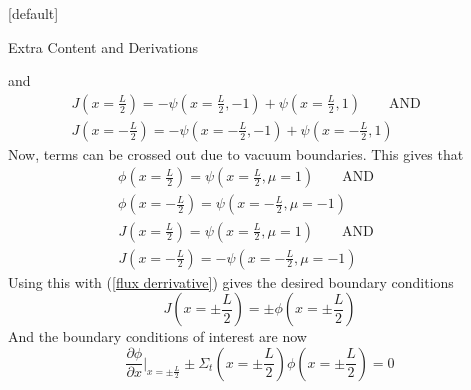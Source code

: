 \documentclass[9pt,t]{beamer}
\makeatletter
\newcommand{\QAND}{\qquad \text{AND} \qquad}
\newenvironment{withoutheadline}{
       \setbeamertemplate{headline}[default]
       \def\beamer@entrycode{\vspace*{-\headheight}}
    }{}
\makeatother
\begin{document}
\begin{withoutheadline}
\begin{frame}[allowframebreaks]{Extra Content and Derivations}
\begin{itemize}
        and
        \begin{multline}
            J(x=\frac{L}{2}) = - \psi(x=\frac{L}{2},-1)  + \psi(x=\frac{L}{2},1) \QAND \\ J(x=-\frac{L}{2}) = - \psi(x=-\frac{L}{2},-1)  + \psi(x=-\frac{L}{2},1)
        \end{multline}
        Now, terms can be crossed out due to vacuum boundaries. This gives that
        \begin{multline}
            \phi(x=\frac{L}{2}) =  \psi(x=\frac{L}{2},\mu =1) \QAND \\ \phi(x=-\frac{L}{2}) =  \psi(x=-\frac{L}{2},\mu =-1)
        \end{multline}
        \begin{multline}
            J(x=\frac{L}{2}) = \psi(x=\frac{L}{2},\mu =1) \QAND \\ J(x=-\frac{L}{2}) = - \psi(x=-\frac{L}{2},\mu =-1)
        \end{multline}
        Using this with (\ref{flux derrivative}) gives the desired boundary conditions
        \begin{equation}
            J(x=\pm \frac{L}{2}) = \pm \phi(x=\pm \frac{L}{2})
        \end{equation}
        And the boundary conditions of interest are now
        \begin{equation}
            \frac{\partial\phi}{\partial x}\bigg|_{x=\pm \frac{L}{2}} \pm  \Sigma_{t}(x=\pm \frac{L}{2})  \phi(x=\pm \frac{L}{2})  = 0
        \end{equation}
    \end{itemize}
\end{frame}
\end{withoutheadline}
\end{document}
